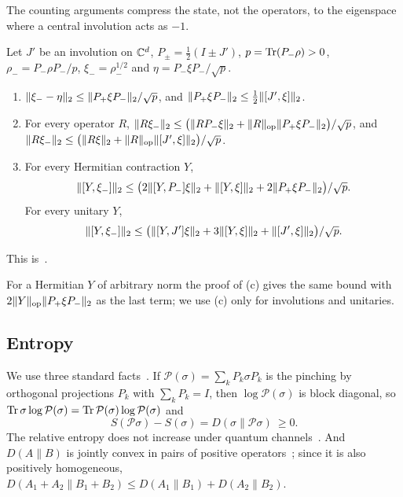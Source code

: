 The counting arguments compress the state, not the operators, to the eigenspace where a central involution acts as
$-1$.

\begin{lemma}\label{lem:sector}
Let $J'$ be an involution on $\mathbb C^d$, $P_\pm=\frac12(I\pm J')$, $p=\operatorname{Tr}(P_-\rho)>0$, $\rho_-=P_-\rho P_-/p$,
$\xi_-=\rho_-^{1/2}$ and $\eta=P_-\xi P_-/\sqrt p$.
\begin{enumerate}[label=(\alph*),itemsep=1pt]
\item $\lVert \xi_--\eta\rVert_2\le\lVert P_+\xi P_-\rVert_2/\sqrt p$, and $\lVert P_+\xi P_-\rVert_2\le\frac12\lVert [J',\xi]\rVert_2$.
\item For every operator $R$, $\lVert R\xi_-\rVert_2\le\bigl(\lVert RP_-\xi\rVert_2+\lVert R\rVert_{\mathrm{op}}\lVert P_+\xi P_-\rVert_2\bigr)/\sqrt p$, and
$\lVert R\xi_-\rVert_2\le\bigl(\lVert R\xi\rVert_2+\lVert R\rVert_{\mathrm{op}}\lVert [J',\xi]\rVert_2\bigr)/\sqrt p$.
\item For every Hermitian contraction $Y$,
\[
\lVert [Y,\xi_-]\rVert_2\le\bigl(2\lVert [Y,P_-]\xi\rVert_2+\lVert [Y,\xi]\rVert_2+2\lVert P_+\xi P_-\rVert_2\bigr)/\sqrt p.
\]
For every unitary $Y$,
\[
\lVert [Y,\xi_-]\rVert_2\le\bigl(\lVert [Y,J']\xi\rVert_2+3\lVert [Y,\xi]\rVert_2+\lVert [J',\xi]\rVert_2\bigr)/\sqrt p.
\]
\end{enumerate}
\end{lemma}

This is~\cite[Lemma~3.10]{DM-game}.

For a Hermitian $Y$ of arbitrary norm the proof of (c) gives the same bound with $2\lVert Y\rVert_{\mathrm{op}}\lVert P_+\xi P_-\rVert_2$ as the last
term; we use (c) only for involutions and unitaries.

\subsection{Entropy}\label{sec:prelim-entropy}

We use three standard facts~\cite[Section~3.7]{DM-game}. If $\mathcal P(\sigma)=\sum_kP_k\sigma P_k$ is the pinching by orthogonal projections
$P_k$ with $\sum_kP_k=I$, then $\log\mathcal P(\sigma)$ is block diagonal, so $\operatorname{Tr}\sigma\log\mathcal P(\sigma)=
\operatorname{Tr}\mathcal P(\sigma)\log\mathcal P(\sigma)$ and
\begin{equation}\label{eq:pinching}
S(\mathcal P\sigma)-S(\sigma)=D(\sigma\|\mathcal P\sigma)\ \ge0 .
\end{equation}
The relative entropy does not increase under quantum channels~\cite{Lin75,Uhl77}. And $D(A\|B)$ is jointly convex in
pairs of positive operators~\cite{Lie73,Lin74}; since it is also positively homogeneous,
$D(A_1+A_2\|B_1+B_2)\le D(A_1\|B_1)+D(A_2\|B_2)$.



